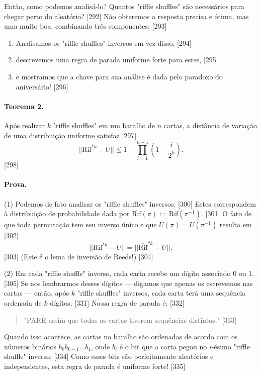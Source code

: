 \documentclass[a4paper]{article}
\begin{document}
Então, como podemos analisá-lo? Quantos "riffle shuffles" são necessários para chegar perto do aleatório? [292] Não obteremos a resposta precisa e ótima, mas uma muito boa, combinando três componentes: [293]
\begin{enumerate}
    \item Analisamos os "riffle shuffles" inversos em vez disso, [294]
    \item descrevemos uma regra de parada uniforme forte para estes, [295]
    \item e mostramos que a chave para sua análise é dada pelo paradoxo do aniversário! [296]
\end{enumerate}

\paragraph{Teorema 2.} Após realizar $k$ "riffle shuffles" em um baralho de $n$ cartas, a distância de variação de uma distribuição uniforme satisfaz [297]
$$ ||\text{Rif}^{*k} - U|| \le 1 - \prod_{i=1}^{n-1}\left(1 - \frac{i}{2^k}\right). $$ [298]

\paragraph{Prova.}
(1) Podemos de fato analisar os "riffle shuffles" inversos. [300] Estes correspondem à distribuição de probabilidade dada por $\overline{\text{Rif}}(\pi) := \text{Rif}(\pi^{-1})$. [301] O fato de que toda permutação tem seu inverso único e que $U(\pi) = U(\pi^{-1})$ resulta em [302]
$$ ||\text{Rif}^{*k} - U|| = ||\overline{\text{Rif}}^{*k} - U||. $$ [303]
(Este é o lema de inversão de Reeds!) [304]

(2) Em cada "riffle shuffle" inverso, cada carta recebe um dígito associado 0 ou 1. [305] Se nos lembrarmos desses dígitos — digamos que apenas os escrevemos nas cartas — então, após $k$ "riffle shuffles" inversos, cada carta terá uma sequência ordenada de $k$ dígitos. [331] Nossa regra de parada é: [332]
\begin{quote}
    "PARE assim que todas as cartas tiverem sequências distintas." [333]
\end{quote}
Quando isso acontece, as cartas no baralho são ordenadas de acordo com os números binários $b_k b_{k-1} \dots b_1$, onde $b_i$ é o bit que a carta pegou no $i$-ésimo "riffle shuffle" inverso. [334] Como esses bits são perfeitamente aleatórios e independentes, esta regra de parada é uniforme forte! [335]
\end{document}
